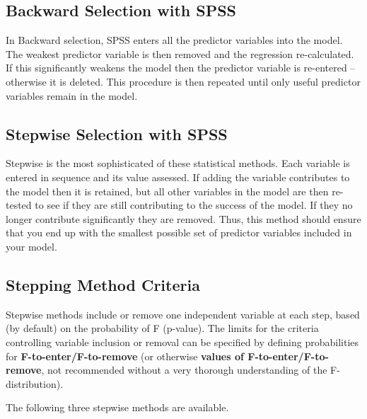 \documentclass[a4paper,12pt]{article}
\begin{document}
\subsection{Backward Selection with SPSS}
In Backward selection, SPSS enters all the predictor variables into the model. The weakest predictor variable is then removed and the regression re-calculated. If this
significantly weakens the model then the predictor variable is re-entered – otherwise it is deleted. This procedure is then repeated until only useful predictor variables remain in the model.


\subsection{Stepwise Selection with SPSS}
Stepwise is the most sophisticated of these statistical methods. Each variable is entered in sequence and its value assessed. If adding the variable contributes to the model then it is retained, but all other variables in the model are then re-tested to see if they are still contributing to the success of the model. If they no longer contribute significantly they are removed. Thus, this method should ensure that you end up with the smallest possible set of predictor variables included in your model.








\subsection{Stepping Method Criteria}
Stepwise methods include or remove one independent variable at each step, based (by default) on the probability of F (p-value). The limits for the criteria controlling variable inclusion or removal can be specified by defining probabilities for \textbf{F-to-enter/F-to-remove} (or otherwise \textbf{values of F-to-enter/F-to-remove}, not recommended without a very thorough understanding of the F-distribution).




The following three stepwise methods are available.
\end{document}
